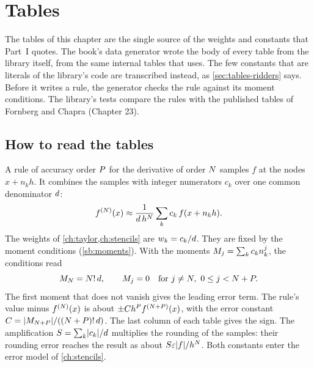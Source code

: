 \chapter{Tables}\label{ch:tables}
\setcounter{topnumber}{4}

The tables of this chapter are the single source of the weights and constants that Part~I quotes. The book's data
generator wrote the body of every table from the library itself, from the same internal tables that
 uses. The few constants that are literals of the library's code are transcribed instead, as
\cref{sec:tables-ridders} says. Before it writes a rule, the generator checks the rule against its moment conditions.
The library's tests compare the rules with the published tables of Fornberg\cite{fornberg1988} and Chapra
(Chapter 23).\cite{chapra2015}

\section{How to read the tables}\label{sec:tables-reading}

A rule of accuracy order $P$ for the derivative of order $N$ samples $f$ at the nodes $x + n_k h$. It
combines the samples with integer numerators $c_k$ over one common denominator $d$:
\begin{equation}
  f^{(N)}(x) \approx \frac{1}{d\, h^{N}} \sum_k c_k\, f(x + n_k h).
  \label{eq:tables-rule}
\end{equation}
The weights of \cref{ch:taylor,ch:stencils} are $w_k = c_k / d$. They are fixed by the moment conditions
(\cref{sb:moments}). With the moments $M_{j} = \sum_k c_k n_k^j$, the conditions read
\begin{equation}
  M_{N} = N!\, d, \qquad M_{j} = 0 \quad \text{for } j \ne N,\ 0 \le j < N + P.
  \label{eq:tables-moments}
\end{equation}
The first moment that does not vanish gives the leading error term. The rule's value minus $f^{(N)}(x)$ is
about $\pm C h^{P} f^{(N+P)}(x)$, with the error constant $C = \lvert M_{N+P} \rvert /
((N+P)!\, d)$. The last column of each table gives the sign. The amplification $S = \sum_k
\lvert c_k \rvert / d$ multiplies the rounding of the samples: their rounding error reaches the result as about $S
\varepsilon \lvert f \rvert / h^{N}$. Both constants enter the error model of \cref{ch:stencils}.


